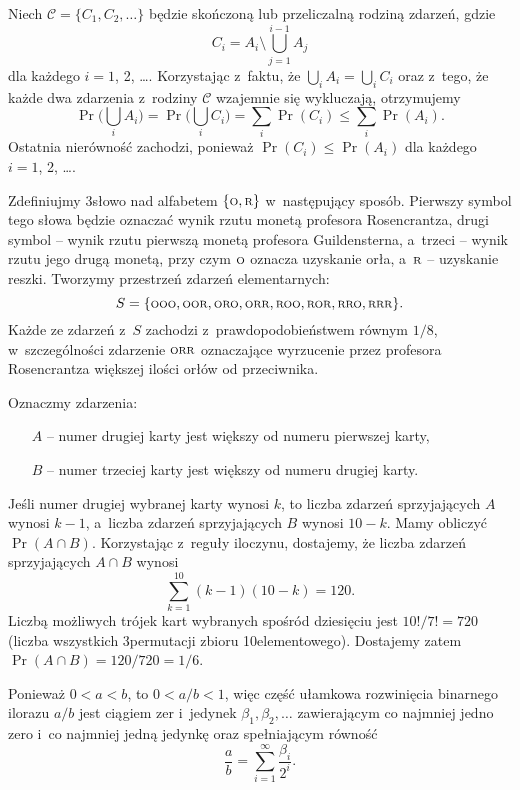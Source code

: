 
\exercise %
Niech $\mathcal{C}=\{C_1,C_2,\dots\}$ będzie skończoną lub przeliczalną rodziną zdarzeń, gdzie
\[
	C_i = A_i\setminus\bigcup_{j=1}^{i-1}A_j
\]
dla każdego $i=1$, 2, \dots.
Korzystając z~faktu, że $\bigcup_iA_i = \bigcup_iC_i$ oraz z~tego, że każde dwa zdarzenia z~rodziny $\mathcal{C}$ wzajemnie się wykluczają, otrzymujemy
\[
	\Pr\biggl(\bigcup_iA_i\biggr) = \Pr\biggl(\bigcup_iC_i\biggr) = \sum_i\Pr(C_i) \le \sum_i\Pr(A_i).
\]
Ostatnia nierówność zachodzi, ponieważ $\Pr(C_i)\le\Pr(A_i)$ dla każdego $i=1$, 2, \dots.

\exercise %
Zdefiniujmy 3\nbhyphen słowo nad alfabetem $\{{\scriptstyle\rm O},{\scriptstyle\rm R}\}$ w~następujący sposób.
Pierwszy symbol tego słowa będzie oznaczać wynik rzutu monetą profesora Rosencrantza, drugi symbol -- wynik rzutu pierwszą monetą profesora Guildensterna, a~trzeci -- wynik rzutu jego drugą monetą, przy czym $\scriptstyle\rm O$ oznacza uzyskanie orła, a~$\scriptstyle\rm R$ -- uzyskanie reszki.
Tworzymy przestrzeń zdarzeń elementarnych:
\[
	S = \{{\scriptstyle\rm OOO},{\scriptstyle\rm OOR},{\scriptstyle\rm ORO},{\scriptstyle\rm ORR},{\scriptstyle\rm ROO},{\scriptstyle\rm ROR},{\scriptstyle\rm RRO},{\scriptstyle\rm RRR}\}.
\]
Każde ze zdarzeń z~$S$ zachodzi z~prawdopodobieństwem równym $1/8$, w~szczególności zdarzenie $\scriptstyle\rm ORR$ oznaczające wyrzucenie przez profesora Rosencrantza większej ilości orłów od przeciwnika.

\exercise %
Oznaczmy zdarzenia:
\begin{itemize}
	\item[$A$] -- numer drugiej karty jest większy od numeru pierwszej karty,
	\item[$B$] -- numer trzeciej karty jest większy od numeru drugiej karty.
\end{itemize}
Jeśli numer drugiej wybranej karty wynosi $k$, to liczba zdarzeń sprzyjających $A$ wynosi $k-1$, a~liczba zdarzeń sprzyjających $B$ wynosi $10-k$.
Mamy obliczyć $\Pr(A\cap B)$.
Korzystając z~reguły iloczynu, dostajemy, że liczba zdarzeń sprzyjających $A\cap B$ wynosi
\[
    \sum_{k=1}^{10}(k-1)(10-k) = 120.
\]
Liczbą możliwych trójek kart wybranych spośród dziesięciu jest $10!/7!=720$ (liczba wszystkich 3\nbhyphen permutacji zbioru 10\nbhyphen elementowego).
Dostajemy zatem $\Pr(A\cap B)=120/720=1/6$.

\exercise %
Ponieważ $0<a<b$, to $0<a/b<1$, więc część ułamkowa rozwinięcia binarnego ilorazu $a/b$ jest ciągiem zer i~jedynek $\beta_1,\beta_2,\dots$ zawierającym co najmniej jedno zero i~co najmniej jedną jedynkę oraz spełniającym równość
\[
    \frac{a}{b} = \sum_{i=1}^\infty\frac{\beta_i}{2^i}.
\]

